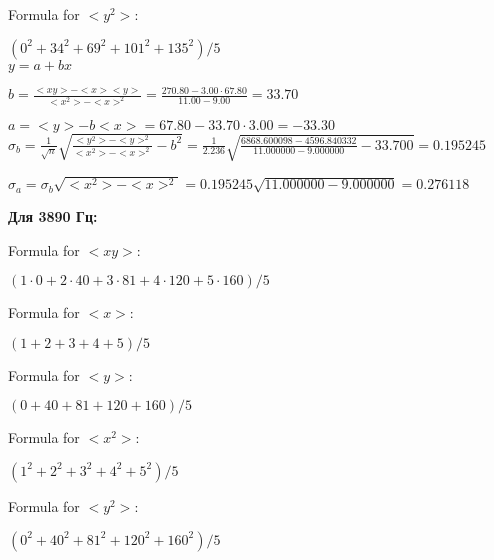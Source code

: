 \documentclass[12pt,a4paper]{article}
\begin{document}
Formula for $<y^2>:$
\vspace{0.5cm}

$(0^2 + 34^2 + 69^2 + 101^2 + 135^2) / 5$
\vspace{0.5cm}\\



$y = a + bx$
\vspace{0.5cm}

$b = \frac{<xy> - <x><y>}{<x^2> - <x>^2} = \frac{270.80 - 3.00 \cdot 67.80}{11.00 - 9.00} = 33.70$
\vspace{0.5cm}

$a =<y> - b<x> = 67.80 - 33.70 \cdot 3.00 = -33.30$
\vspace{0.5cm}\\

$\sigma_b = \frac{1}{\sqrt{n}} \sqrt { \frac{<y^2> - <y>^2}{<x^2> - <x>^2}  - b^2} = \frac{1}{2.236} \sqrt {\frac{6868.600098 - 4596.840332}{11.000000 - 9.000000} - 33.700} = 0.195245$
\vspace{0.5cm}

$\sigma_a = \sigma_b \sqrt{<x^2> - <x>^2} = 0.195245 \sqrt{11.000000 - 9.000000} = 0.276118$
\vspace{0.5cm}

\textbf{Для 3890 Гц:}
\vspace{0.5cm}

Formula for $<xy>:$
\vspace{0.5cm}

$(1 \cdot 0 + 2 \cdot 40 + 3 \cdot 81 + 4 \cdot 120 + 5 \cdot 160) / 5$
\vspace{0.5cm}

Formula for $<x>:$
\vspace{0.5cm}

$(1 + 2 + 3 + 4 + 5) / 5$
\vspace{0.5cm}

Formula for $<y>:$
\vspace{0.5cm}

$(0 + 40 + 81 + 120 + 160) / 5$
\vspace{0.5cm}

Formula for $<x^2>$:
\vspace{0.5cm}

$(1^2 + 2^2 + 3^2 + 4^2 + 5^2) / 5$
\vspace{0.5cm}

Formula for $<y^2>:$
\vspace{0.5cm}

$(0^2 + 40^2 + 81^2 + 120^2 + 160^2) / 5$
\vspace{0.5cm}
\end{document}

